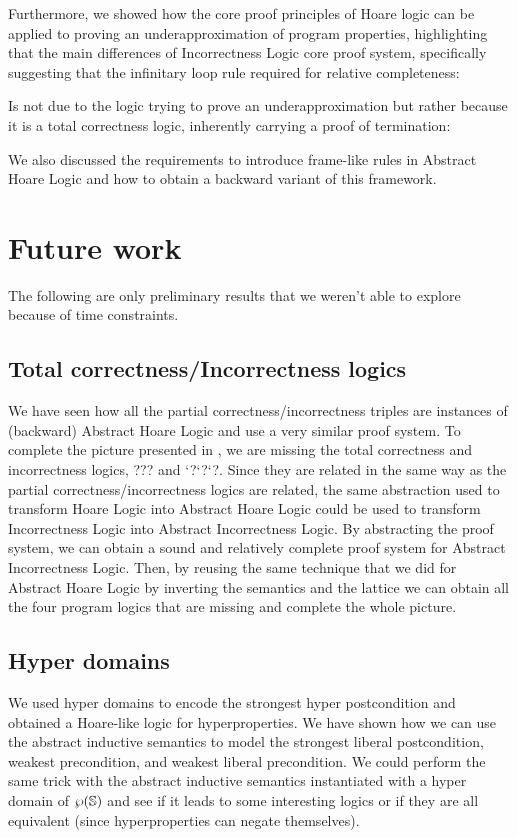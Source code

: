 \documentclass[
  10pt,       %
  twoside,    %
  a4paper,    %
  english,    %
  tikz,       %
  openright,  %
]{book}
\begin{document}
Furthermore, we showed how the core proof principles of Hoare logic can be
applied to proving an underapproximation of program properties, highlighting
that the main differences of Incorrectness Logic core proof system, specifically 
suggesting that the infinitary loop rule required for relative completeness:

\begin{prooftree}
\end{prooftree}

Is not due to the logic trying to prove an underapproximation but rather
because it is a total correctness logic, inherently carrying a proof of
termination:


We also discussed the requirements to introduce frame-like rules in Abstract
Hoare Logic and how to obtain a backward variant of this framework. 

\section{Future work}
The following are only preliminary results that we weren't able to explore
because of time constraints.

\subsection{Total correctness/Incorrectness logics}
We have seen how all the partial correctness/incorrectness triples are
instances of (backward) Abstract Hoare Logic and use a very similar proof
system. To complete the picture presented in \cite{Zhang22}, we are missing the
total correctness and incorrectness logics, ??? and `?`?`?. Since they are 
related in the same way as the partial correctness/incorrectness logics are 
related, the same abstraction used to transform Hoare Logic into Abstract Hoare 
Logic could be used to transform Incorrectness Logic \cite{Moller21} into 
Abstract Incorrectness Logic. By abstracting the proof system, we can obtain a 
sound and relatively complete proof system for Abstract Incorrectness Logic. 
Then, by reusing the same technique that we did for Abstract Hoare Logic by 
inverting the semantics and the lattice we can obtain all the four program 
logics that are missing and complete the whole picture.

\subsection{Hyper domains}
We used hyper domains to encode the strongest hyper postcondition and obtained
a Hoare-like logic for hyperproperties. We have shown how we can use the
abstract inductive semantics to model the strongest liberal postcondition,
weakest precondition, and weakest liberal precondition. We could perform the
same trick with the abstract inductive semantics instantiated with a hyper
domain of $\pow{\states}$ and see if it leads to some interesting logics or if
they are all equivalent (since hyperproperties can negate themselves).
\end{document}
